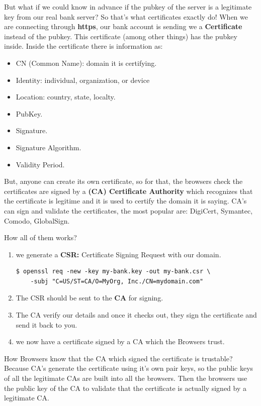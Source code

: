 \documentclass{article}
\newenvironment{blocktemplateI}[1]{%
    \tcolorbox[beamer,%
    noparskip,breakable,
    colframe=Violet,%
    colbacklower=Black,%
    title=#1]}%
    {\endtcolorbox}
\newenvironment{codetemplate}[1][]{%
  \mybasecolorbox[#1]
  \itshape
}{%
  \endmybasecolorbox
}
\begin{document}
But what if we could know in advance if the pubkey of the server is a legitimate key from our real bank server?
So that's what certificates exactly do! When we are connecting through \textbf{https}, our bank account is sending we a \textbf{Certificate} instead of the pubkey.
This certificate (among other things) has the pubkey inside. Inside the certificate there is information as:
\begin{itemize}
    \item CN (Common Name): domain it is certifying.
    \item Identity: individual, organization, or device
    \item Location: country, state, localty.
    \item PubKey.
    \item Signature.
    \item Signature Algorithm.
    \item Validity Period.
\end{itemize}

But, anyone can create its own certificate, so for that, the browsers check the certificates are signed by a \textbf{(CA) Certificate Authority} which recognizes that 
the certificate is legitime and it is used to certify the domain it is saying. CA's can sign and validate the certificates, the most popular are: DigiCert, Symantec, Comodo, GlobalSign.

How all of them works?

\begin{enumerate}
    \item we generate a \textbf{CSR:} Certificate Signing Request with our domain.
\begin{codetemplate}{}
\begin{verbatim}
$ openssl req -new -key my-bank.key -out my-bank.csr \
    -subj "C=US/ST=CA/O=MyOrg, Inc./CN=mydomain.com"
\end{verbatim}
\end{codetemplate}
    \item The CSR should be sent to the \textbf{CA} for signing.
    \item The CA verify our details and once it checks out, they sign the certificate and send it back to you.
    \item we now have a certificate signed by a CA which the Browsers trust.
\end{enumerate}

\begin{blocktemplateI}{Note}
How Browsers know that the CA which signed the certificate is trustable? Because CA's generate the certificate using it's own pair keys, so the public keys of all the legitimate CAs are built
into all the browsers. Then the browsers use the public key of the CA to validate that the certificate
is actually signed by a legitimate CA.
\end{blocktemplateI}
\end{document}
